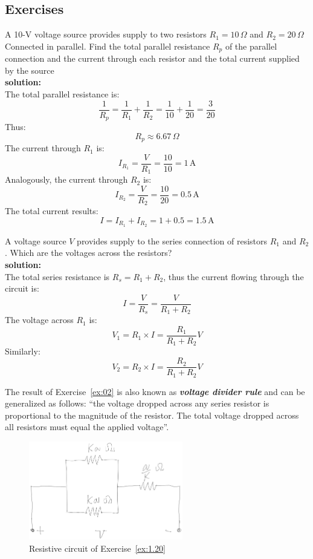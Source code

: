 \subsection*{Exercises}
\begin{exercise}
A 10-V voltage source provides supply to two resistors $R_1=10\,\Omega$ and $R_2=20\,\Omega$ Connected in parallel. Find the total parallel resistance $R_p$ of the parallel connection and the current through each resistor and the total current supplied by the source\\

\textbf{solution:}\\
The total parallel resistance is:
\[\frac{1}{R_p} = \frac{1}{R_1} + \frac{1}{R_2} = \frac{1}{10} + \frac{1}{20} = \frac{3}{20}\]
Thus:
\[R_p \approx 6.67\,\Omega\]
The current through $R_1$ is:
\[I_{R_1}=\frac{V}{R_1}=\frac{10}{10}=1\,\textrm{A}\]
Analogously, the current through $R_2$ is:
\[I_{R_2}=\frac{V}{R_2}=\frac{10}{20}=0.5\,\textrm{A}\]
The total current results:
\[I=I_{R_1} + I_{R_2} = 1 + 0.5 = 1.5\,\textrm{A}\]
\end{exercise}

\begin{exercise}\label{ex:02}
A voltage source $V$ provides supply to the series connection of resistors $R_1$ and $R_2$. Which are the voltages across the resistors?\\

\textbf{solution:}\\
The total series resistance is $R_s = R_1 + R_2$, thus the current flowing through the circuit is:
\[I=\frac{V}{R_s}=\frac{V}{R_1 + R_2}\]
The voltage across $R_1$ is:
\[V_1 = R_1 \times I = \frac{R_1}{R_1 + R_2}V\]
Similarly:
\[V_2 = R_2 \times I = \frac{R_2}{R_1 + R_2}V\]
\end{exercise}
\begin{remark}
  The result of Exercise~\ref{ex:02} is also known as
  \textbf{\emph{voltage divider rule}} and can be generalized as follows: ``the voltage dropped across any series resistor is proportional to the magnitude of the resistor. The total voltage dropped across all resistors must equal the applied voltage''.
\end{remark}

\begin{figure}[h!]
  \centering
  \includegraphics[width=0.6\textwidth]{"images/Fig-01"}
  \caption{Resistive circuit of Exercise~\ref{ex:1.20}} 
  \label{Fig:Ex:1.20}
\end{figure}

